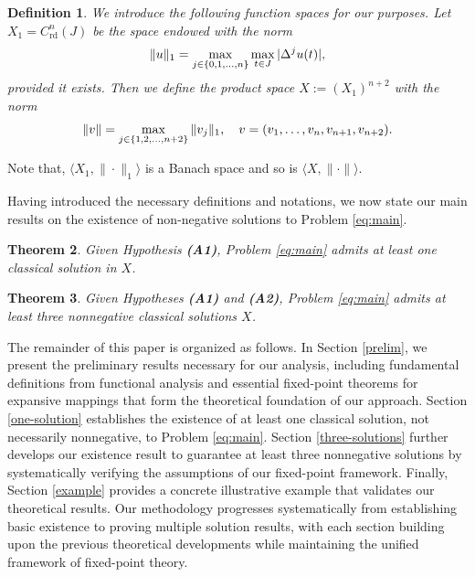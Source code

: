 \documentclass[reqno, 12pt]{amsart}
\newtheorem{theorem}{Theorem}[section]
\newtheorem{definition}[theorem]{Definition}
\numberwithin{equation}{section}
\DeclareMathOperator{\rd}{rd}
\begin{document}
\begin{definition}
We introduce the following function spaces for our purposes. Let $X_1 = C^n_{\rd}(J)$ be the space endowed with the norm
\begin{align}
\|u\|_1 = \max_{j\in\{0,1,\ldots,n\}} \max_{t\in J} |\Delta^j u(t)|, \notag
\end{align}
provided it exists. Then we define the product space $X := (X_1)^{n+2}$ with the norm
\begin{align}
\|v\| = \max_{j\in\{1,2,\ldots,n+2\}} \|v_j\|_1, \quad v = (v_1, \ldots, v_n, v_{n+1}, v_{n+2}). \notag
\end{align}    
\end{definition}
Note that, $\langle X_1,\|\cdot\|_1\rangle$ is a Banach space and so is $\langle X, \|\cdot \|\rangle $. 

Having introduced the necessary definitions and notations, we now state our main results on the existence of non-negative solutions to Problem \eqref{eq:main}.
\begin{theorem} \label{thm:one-sol}
Given Hypothesis {\bf(A1)},  Problem \eqref{eq:main} admits at least one classical solution in $X$.
\end{theorem}


\begin{theorem} \label{thm:three-sol}
Given Hypotheses {\bf(A1)} and {\bf(A2)}, Problem \eqref{eq:main} admits at least three nonnegative classical solutions $X$.
\end{theorem}

The remainder of this paper is organized as follows. In Section \ref{prelim}, we present the preliminary results necessary for our analysis, including fundamental definitions from functional analysis and essential fixed-point theorems for expansive mappings that form the theoretical foundation of our approach. Section \ref{one-solution} establishes the existence of at least one classical solution, not necessarily nonnegative, to Problem \eqref{eq:main}.  Section \ref{three-solutions} further develops our existence result to guarantee at least three nonnegative solutions by systematically verifying the assumptions of our fixed-point framework. Finally, Section \ref{example} provides a concrete illustrative example that validates our theoretical results. Our methodology progresses systematically from establishing basic existence to proving multiple solution results, with each section building upon the previous theoretical developments while maintaining the unified framework of fixed-point theory.
\end{document}
